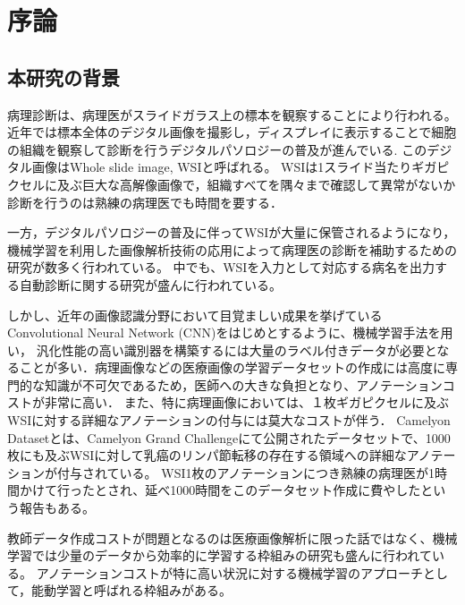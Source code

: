 \chapter{序論}

\section{本研究の背景}

病理診断は、病理医がスライドガラス上の標本を観察することにより行われる。
近年では標本全体のデジタル画像を撮影し，ディスプレイに表示することで細胞の組織を観察して診断を行うデジタルパソロジーの普及が進んでいる\cite{pantanowitz2010digital}.
このデジタル画像はWhole slide image, WSIと呼ばれる。
WSIは1スライド当たりギガピクセルに及ぶ巨大な高解像画像で，組織すべてを隅々まで確認して異常がないか診断を行うのは熟練の病理医でも時間を要する．

一方，デジタルパソロジーの普及に伴ってWSIが大量に保管されるようになり，機械学習を利用した画像解析技術の応用によって病理医の診断を補助するための研究が数多く行われている\cite{gurcan2009histopathological, komuraishikawa, litjens2017survey}。
中でも、WSIを入力として対応する病名を出力する自動診断に関する研究が盛んに行われている\cite{doyle2008automated,dundar2011computerized}。

しかし、近年の画像認識分野において目覚ましい成果を挙げているConvolutional Neural Network (CNN)をはじめとするように、機械学習手法を用い，
汎化性能の高い識別器を構築するには大量のラベル付きデータが必要となることが多い．病理画像などの医療画像の学習データセットの作成には高度に専門的な知識が不可欠であるため，医師への大きな負担となり、アノテーションコストが非常に高い．
また、特に病理画像においては、１枚ギガピクセルに及ぶWSIに対する詳細なアノテーションの付与には莫大なコストが伴う．
Camelyon Datasetとは、Camelyon Grand Challenge\cite{Camelyon17}にて公開されたデータセットで、1000枚にも及ぶWSIに対して乳癌のリンパ節転移の存在する領域への詳細なアノテーションが付与されている。
WSI1枚のアノテーションにつき熟練の病理医が1時間かけて行ったとされ、延べ1000時間をこのデータセット作成に費やしたという報告もある。

教師データ作成コストが問題となるのは医療画像解析に限った話ではなく、機械学習では少量のデータから効率的に学習する枠組みの研究も盛んに行われている。
アノテーションコストが特に高い状況に対する機械学習のアプローチとして，能動学習と呼ばれる枠組みがある。

